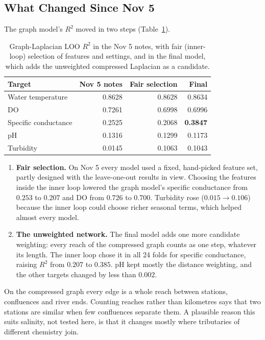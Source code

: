\documentclass[12pt]{article}
\begin{document}
\subsection{What Changed Since Nov 5}

The graph model's $R^2$ moved in two steps (Table~\ref{tab:nov5}).

\begin{table}[H]
\centering
\caption{Graph-Laplacian LOO $R^2$ in the Nov 5 notes, with fair (inner-loop) selection of features
and settings, and in the final model, which adds the unweighted compressed Laplacian as a candidate.}
\label{tab:nov5}
\begin{tabular}{l rrr}
\toprule
Target & Nov 5 notes & Fair selection & Final \\
\midrule
Water temperature    & 0.8628 & 0.8628 & 0.8634 \\
DO                   & 0.7261 & 0.6998 & 0.6996 \\
Specific conductance & 0.2525 & 0.2068 & \textbf{0.3847} \\
pH                   & 0.1316 & 0.1299 & 0.1173 \\
Turbidity            & 0.0145 & 0.1063 & 0.1043 \\
\bottomrule
\end{tabular}
\end{table}

\begin{enumerate}
  \item \textbf{Fair selection.} On Nov 5 every model used a fixed, hand-picked feature set, partly
        designed with the leave-one-out results in view. Choosing the features inside the inner
        loop lowered the graph model's specific conductance from $0.253$ to $0.207$ and DO from
        $0.726$ to $0.700$. Turbidity rose ($0.015 \to 0.106$) because the inner loop could choose
        richer seasonal terms, which helped almost every model.
  \item \textbf{The unweighted network.} The final model adds one more candidate weighting: every
        reach of the compressed graph counts as one step, whatever its length. The inner loop chose
        it in all 24 folds for specific conductance, raising $R^2$ from $0.207$ to $0.385$. pH kept
        mostly the distance weighting, and the other targets changed by less than $0.002$.
\end{enumerate}

On the compressed graph every edge is a whole reach between stations, confluences and river ends.
Counting reaches rather than kilometres says that two stations are similar when few confluences
separate them. A plausible reason this suits salinity, not tested here, is that it changes mostly
where tributaries of different chemistry join.
\end{document}
